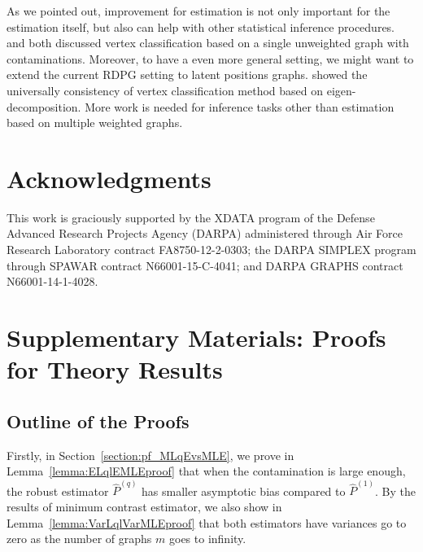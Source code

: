 \documentclass[a4paper]{article}
\renewcommand{\hat}{\widehat}
\begin{document}
As we pointed out, improvement for estimation is not only important for the estimation itself, but also can help with other statistical inference procedures. \citet{priebe2015statistical} and \citet{chen2016robust} both discussed vertex classification based on a single unweighted graph with contaminations.
Moreover, to have a even more general setting, we might want to extend the current RDPG setting to latent positions graphs. \citet{tang2013universally} showed the universally consistency of vertex classification method based on eigen-decomposition.
More work is needed for inference tasks other than estimation based on multiple weighted graphs.


\section*{Acknowledgments}
This work is graciously supported by the XDATA program of the Defense
Advanced Research Projects Agency (DARPA) administered through Air
Force Research Laboratory contract FA8750-12-2-0303; the DARPA SIMPLEX
program through SPAWAR contract N66001-15-C-4041; and DARPA GRAPHS
contract N66001-14-1-4028.


{}




\newpage

\appendix


\section{Supplementary Materials: Proofs for Theory Results}

\subsection{Outline of the Proofs}

Firstly, in Section~\ref{section:pf_MLqEvsMLE}, we prove in Lemma~\ref{lemma:ELqlEMLEproof} that when the contamination is large enough, the robust estimator $\hat{P}^{(q)}$ has smaller asymptotic bias compared to $\hat{P}^{(1)}$. By the results of minimum contrast estimator, we also show in Lemma~\ref{lemma:VarLqlVarMLEproof} that both estimators have variances go to zero as the number of graphs $m$ goes to infinity.
\end{document}
